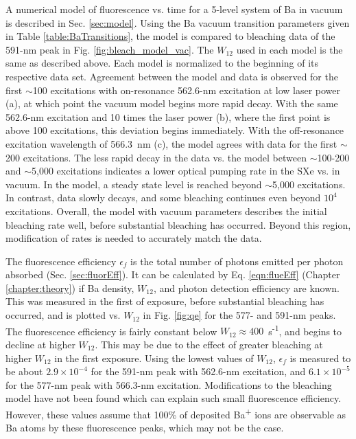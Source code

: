 A numerical model of fluorescence vs. time for a 5-level system of Ba in vacuum is described in Sec. \ref{sec:model}.  Using the Ba vacuum transition parameters given in Table \ref{table:BaTransitions}, the model is compared to bleaching data of the 591-nm peak in Fig. \ref{fig:bleach_model_vac}.  The $W_{12}$ used in each model is the same as described above.  Each model is normalized to the beginning of its respective data set.  Agreement between the model and data is observed for the first $\sim$100 excitations with on-resonance 562.6-nm excitation at low laser power (a), at which point the vacuum model begins more rapid decay.  With the same 562.6-nm excitation and 10 times the laser power (b), where the first point is above 100 excitations, this deviation begins immediately.  With the off-resonance excitation wavelength of 566.3~nm (c), the model agrees with data for the first $\sim$200 excitations.  The less rapid decay in the data vs. the model between $\sim$100-200 and $\sim$5,000 excitations indicates a lower optical pumping rate in the SXe vs. in vacuum.  In the model, a steady state level is reached beyond $\sim$5,000 excitations.  In contrast, data slowly decays, and some bleaching continues even beyond $10^{4}$ excitations.  Overall, the model with vacuum parameters describes the initial bleaching rate well, before substantial bleaching has occurred.  Beyond this region, modification of rates is needed to accurately match the data.

The fluorescence efficiency $\epsilon_{f}$ is the total number of photons emitted per photon absorbed (Sec. \ref{sec:fluorEff}).  It can be calculated by Eq. \ref{eqn:flueEff} (Chapter \ref{chapter:theory}) if Ba density, $W_{12}$, and photon detection efficiency are known.  This was measured in the first of exposure, before substantial bleaching has occurred, and is plotted vs. $W_{12}$ in Fig. \ref{fig:qe} for the 577- and 591-nm peaks.  The fluorescence efficiency is fairly constant below $W_{12} \approx 400$~s\textsuperscript{-1}, and begins to decline at higher $W_{12}$.  This may be due to the effect of greater bleaching at higher $W_{12}$ in the first exposure.  Using the lowest values of $W_{12}$, $\epsilon_{f}$ is measured to be about $2.9 \times 10^{-4}$ for the 591-nm peak with 562.6-nm excitation, and $6.1 \times 10^{-5}$ for the 577-nm peak with 566.3-nm excitation.  Modifications to the bleaching model have not been found which can explain such small fluorescence efficiency.  However, these values assume that 100\% of deposited Ba\textsuperscript{+} ions are observable as Ba atoms by these fluorescence peaks, which may not be the case.

